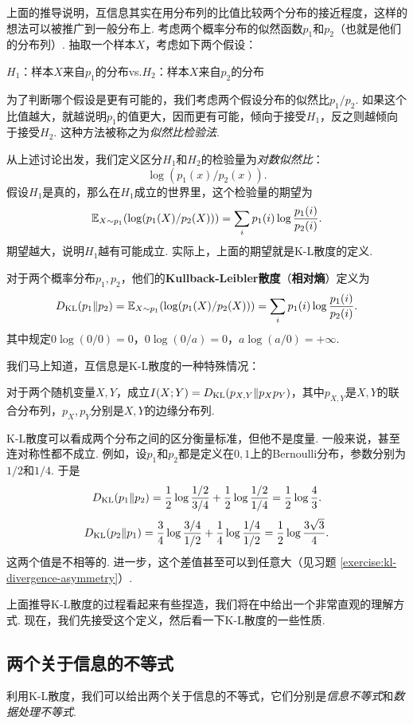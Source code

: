 上面的推导说明，互信息其实在用分布列的比值比较两个分布的接近程度，这样的想法可以被推广到一般分布上. 考虑两个概率分布的似然函数$p_1$和$p_2$（也就是他们的分布列）. 抽取一个样本$X$，考虑如下两个假设：
\begin{center}
    $H_1$：样本$X$来自$p_1$的分布\quad vs.\quad $H_2$：样本$X$来自$p_2$的分布
\end{center}

为了判断哪个假设是更有可能的，我们考虑两个假设分布的似然比$p_1/p_2$. 如果这个比值越大，就越说明$p_1$的值更大，因而更有可能，倾向于接受$H_1$，反之则越倾向于接受$H_2$. 这种方法被称之为\textit{似然比检验法}.

从上述讨论出发，我们定义区分$H_1$和$H_2$的检验量为\textit{对数似然比}：
\[\log(p_1(x)/p_2(x)).\]
假设$H_1$是真的，那么在$H_1$成立的世界里，这个检验量的期望为
    \[\mathbb{E}_{X\sim p_1}(\log(p_1(X)/p_2(X)))=\sum_ip_1(i)\log\frac{p_1(i)}{p_2(i)}.\]
期望越大，说明$H_1$越有可能成立. 实际上，上面的期望就是K-L散度的定义.
\begin{definition}
    对于两个概率分布$p_1,p_2$，他们的\textbf{Kullback-Leibler散度}（\textbf{相对熵}）定义为
    \[D_{\mathrm{KL}}(p_1\| p_2)=\mathbb{E}_{X\sim p_1}(\log(p_1(X)/p_2(X)))=\sum_ip_1(i)\log\frac{p_1(i)}{p_2(i)}.\]
其中规定$0\log(0/0)=0$，$0\log(0/a)=0$，$a\log(a/0)=+\infty$.
\end{definition}
我们马上知道，互信息是K-L散度的一种特殊情况：
\begin{proposition}\label{prop:mutual-information-kl-divergence}
    对于两个随机变量$X,Y$，成立$I(X;Y)=D_{\mathrm{KL}}(p_{X,Y}\|p_Xp_Y)$，其中$p_{X,Y}$是$X,Y$的联合分布列，$p_X,p_Y$分别是$X,Y$的边缘分布列.
\end{proposition}

K-L散度可以看成两个分布之间的区分衡量标准，但他不是度量. 一般来说，甚至连对称性都不成立. 例如，设$p_1$和$p_2$都是定义在$0,1$上的Bernoulli分布，参数分别为$1/2$和$1/4$. 于是
\[D_{\mathrm{KL}}(p_1\Vert p_2) = \frac12\log\frac{1/2}{3/4} + \frac12\log\frac{1/2}{1/4} = \frac12\log\frac43.\]
\[D_{\mathrm{KL}}(p_2\Vert p_1) = \frac34\log\frac{3/4}{1/2} + \frac14\log\frac{1/4}{1/2} = \frac12\log\frac{3\sqrt3}{4}.\]
这两个值是不相等的. 进一步，这个差值甚至可以到任意大（见习题 \ref{exercise:kl-divergence-asymmetry}）.

上面推导K-L散度的过程看起来有些捏造，我们将在中给出一个非常直观的理解方式. 现在，我们先接受这个定义，然后看一下K-L散度的一些性质.

\subsection{两个关于信息的不等式}
利用K-L散度，我们可以给出两个关于信息的不等式，它们分别是\textit{信息不等式}和\textit{数据处理不等式}.

